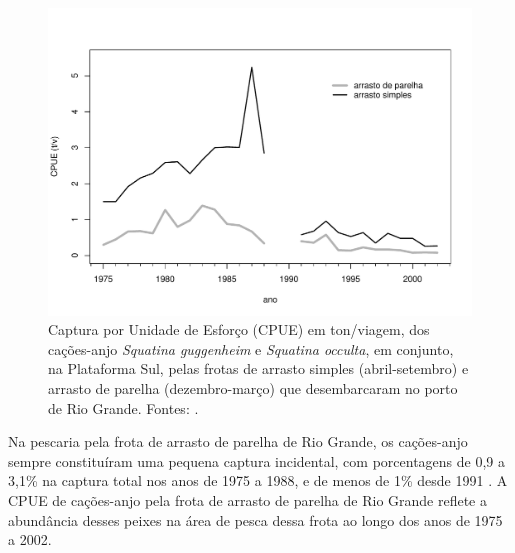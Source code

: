 \documentclass[a4paper,11pt,twoside,showtrims,onecolumn,openright,final]{memoir}
\begin{document}

%
%

\begin{figure}
\begin{center}
\includegraphics[width=\textwidth]{CPUESAFRAANJOS}
\end{center}
\caption[Captura por Unidade de Esforço (CPUE) em ton/viagem, 
	 dos cações-anjo \emph{Squatina guggenheim} e \emph{Squatina occulta}, em conjunto, na Plataforma Sul, 
	 pelas frotas de arrasto simples e arrasto de parelha de Rio Grande]
	{Captura por Unidade de Esforço (CPUE) em ton/viagem, 
	 dos cações-anjo \emph{Squatina guggenheim} e \emph{Squatina occulta}, em conjunto, na Plataforma Sul, 
	 pelas frotas de arrasto simples (abril-setembro) e arrasto de parelha (dezembro-março)
	 que desembarcaram no porto de Rio Grande. Fontes: \citet{miranda2003,ceperg2003}.}
\label{fig:anjos-cpuesafra-1975a2002}
\end{figure}

 
Na pescaria pela frota de arrasto de parelha de Rio Grande, os cações-anjo sempre 
constituíram uma pequena captura incidental, com porcentagens de 0,9 a 3,1\% na 
captura total nos anos de 1975 a 1988,  e de menos de 1\% 
desde 1991 \citep{haimovici1997,miranda2003}. %
A CPUE de cações-anjo pela frota de arrasto de parelha de Rio Grande reflete a abundância 
desses peixes na área de pesca dessa frota ao longo dos anos de 1975 a 2002. 
\end{document}
